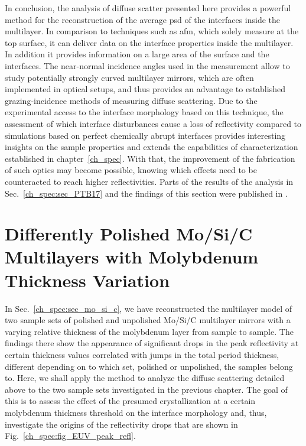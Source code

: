 In conclusion, the analysis of diffuse scatter presented here provides a powerful method for the reconstruction of the average \gls{psd} of the interfaces inside the multilayer. In comparison to techniques such as \gls{afm}, which solely measure at the top surface, it can deliver data on the interface properties inside the multilayer. In addition it provides information on a large area of the surface and the interfaces. The near-normal incidence angles used in the measurement allow to study potentially strongly curved multilayer mirrors, which are often implemented in optical setups, and thus provides an advantage to established grazing-incidence methods of measuring diffuse scattering. Due to the experimental access to the interface morphology based on this technique, the assessment of which interface disturbances cause a loss of reflectivity compared to simulations based on perfect chemically abrupt interfaces provides interesting insights on the sample properties and extends the capabilities of characterization established in chapter~\ref{ch_spec}. With that, the improvement of the fabrication of such optics may become possible, knowing which effects need to be counteracted to reach higher reflectivities. Parts of the results of the analysis in Sec.~\ref{ch_spec:sec_PTB17} and the findings of this section were published in .

\section{Differently Polished Mo/Si/C Multilayers with Molybdenum Thickness Variation} \label{ch_diff:sec_mo_si_c}
In Sec.~\ref{ch_spec:sec_mo_si_c}, we have reconstructed the multilayer model of two sample sets of polished and unpolished Mo/Si/C multilayer mirrors with a varying relative thickness of the molybdenum layer from sample to sample. The findings there show the appearance of significant drops in the peak reflectivity at certain thickness values correlated with jumps in the total period thickness, different depending on to which set, polished or unpolished, the samples belong to. Here, we shall apply the method to analyze the diffuse scattering detailed above to the two sample sets investigated in the previous chapter. The goal of this is to assess the effect of the presumed crystallization at a certain molybdenum thickness threshold on the interface morphology and, thus, investigate the origins of the reflectivity drops that are shown in Fig.~\ref{ch_spec:fig_EUV_peak_refl}.

